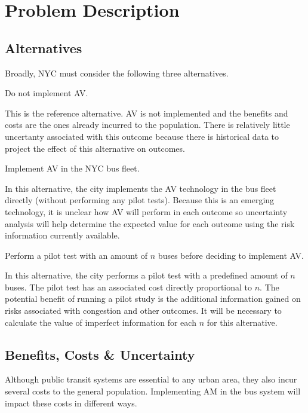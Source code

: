 \documentclass[11pt, letterpaper]{article}
\begin{document}
\section{Problem Description} \label{problem}
\subsection{Alternatives}

Broadly, NYC must consider the following three alternatives.

\begin{description}[leftmargin=0pt]
\item[Alternative 1:] Do not implement AV.

This is the reference alternative. AV is not implemented and the
benefits and costs are the ones already incurred to the population.
There is relatively little uncertanty associated with this outcome
because there is historical data to project the effect of this
alternative on outcomes.

\item[Alternative 2:] Implement AV in the NYC bus fleet.

In this alternative, the city implements the AV technology in the bus
fleet directly (without performing any pilot tests).  Because this is
an emerging technology, it is unclear how AV will perform in each
outcome so uncertainty analysis will help determine the expected value
for each outcome using the risk information currently available.

\item[Alternative 3:] Perform a pilot test with an amount of $n$ buses
  before deciding to implement AV.

In this alternative, the city performs a pilot test with a predefined
amount of $n$ buses. The pilot test has an associated cost directly
proportional to $n$.  The potential benefit of running a pilot study
is the additional information gained on risks associated with
congestion and other outcomes.  It will be necessary to calculate the
value of imperfect information for each $n$ for this alternative.

\end{description}

\subsection{Benefits, Costs \& Uncertainty}

Although public transit systems are essential to any urban area, they 
also incur several costs to the general population. Implementing AM 
in the bus system will impact these costs in different ways.
\end{document}
